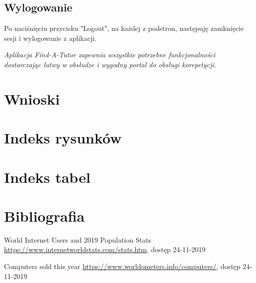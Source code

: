 \documentclass[12pt]{article}
\numberwithin{figure}{section}
\begin{document}
\begin{sloppypar}
\subsection{Wylogowanie}
Po naciśnięciu przycisku "Logout", na każdej z podstron, następuję zamknięcie sesji i wylogowanie z aplikacji. \newline

\textit{Aplikacja Find-A-Tutor zapewnia wszystkie potrzebne funkcjonalności dostarczając łatwy w obsłudze i wygodny portal do obsługi korepetycji.}

\section{Wnioski}



    \clearpage
    
    \section{Indeks rysunków}
        \listoffigures
    \clearpage    
    
    \section{Indeks tabel}
        \listoftables
    \clearpage
    
    \section{Bibliografia}
    \renewcommand{\section}[2]{}
    \begin{thebibliography}{99}
    
    World Internet Users and 2019 Population Stats
    \url{https://www.internetworldstats.com/stats.htm}, dostęp 24-11-2019

    Computers sold this year
    \url{https://www.worldometers.info/computers/}, dostęp 24-11-2019
     

\end{thebibliography}
\end{sloppypar}
\end{document}

